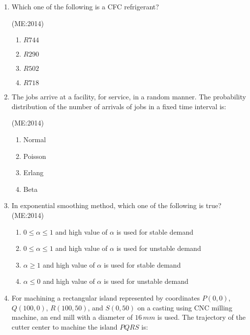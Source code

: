\documentclass[journal,12pt,onecolumn]{IEEEtran}
\theoremstyle{remark}
\begin{document}
\begin{enumerate}
	    \hfill{(ME:2014)}
    \begin{multicols}{4}
    \begin{enumerate}
        \item $0.34$
        \item $2.48$
        \item $2.92$
        \item $3.43$
    \end{enumerate}
    \end{multicols}

    \item Which one of the following is a CFC refrigerant?
	   
	    \hfill{(ME:2014)}
    \begin{multicols}{4}
    \begin{enumerate}
        \item $R744$
        \item $R290$
        \item $R502$
        \item $R718$
    \end{enumerate}
    \end{multicols}
\vspace{0.5cm}
    \item The jobs arrive at a facility, for service, in a random manner. The probability distribution of the number of arrivals of jobs in a fixed time interval is: 

	    \hfill{(ME:2014)}
		\begin{multicols}{4}
    \begin{enumerate}
        \item Normal
        \item Poisson
        \item Erlang
        \item Beta
    \end{enumerate}
    \end{multicols}
\vspace{0.5cm}
    \item In exponential smoothing method, which one of the following is true? 
	    \hfill{(ME:2014)}
    \begin{enumerate}
        \item $0 \leq \alpha \leq 1$ and high value of $\alpha$ is used for stable demand
        \item $0 \leq \alpha \leq 1$ and high value of $\alpha$ is used for unstable demand
        \item $\alpha \geq 1$ and high value of $\alpha$ is used for stable demand
        \item $\alpha \leq 0$ and high value of $\alpha$ is used for unstable demand
    \end{enumerate}
\vspace{0.5cm}
    \item For machining a rectangular island represented by coordinates $P(0,0)$, $Q(100,0)$, $R(100,50)$, and $S(0,50)$ on a casting using CNC milling machine, an end mill with a diameter of $16 \, mm$ is used. The trajectory of the cutter center to machine the island $PQRS$ is:


\end{enumerate}
\end{document}
